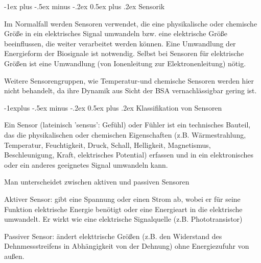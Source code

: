\documentclass[a4paper]{article}
\makeatletter
\renewcommand{\section}{\@startsection{section}{1}{0mm}%
 {-1ex plus -.5ex minus -.2ex}%
 {0.5ex plus .2ex}%
 {\normalfont\large\bfseries}}
\renewcommand{\subsection}{\@startsection{subsection}{2}{0mm}%
 {-1explus -.5ex minus -.2ex}%
 {0.5ex plus .2ex}%
 {\normalfont\normalsize\bfseries}}
\makeatother
\begin{document}
\raggedright
\begin{multicols}{3}\scriptsize
  \setlength{\premulticols}{1pt}
  \setlength{\postmulticols}{1pt}
  \setlength{\multicolsep}{1pt}
  \setlength{\columnsep}{2pt}


  \section{Sensorik}

  Im Normalfall werden Sensoren verwendet, die eine physikalische oder
  chemische Größe in ein elektrisches Signal umwandeln bzw. eine
  elektrische Größe beeinflussen, die weiter verarbeitet werden können.
  Eine Umwandlung der Energieform der Biosignale ist notwendig. Selbst bei
  Sensoren für elektrische Größen ist eine Umwandlung (von Ionenleitung
  zur Elektronenleitung) nötig.

  Weitere Sensorengruppen, wie Temperatur-und chemische Sensoren werden
  hier nicht behandelt, da ihre Dynamik aus Sicht der BSA vernachlässigbar
  gering ist.


  \subsection{Klassifikation von Sensoren}

  Ein Sensor (lateinisch 'sensus': Gefühl) oder Fühler ist ein technisches
  Bauteil, das die physikalischen oder chemischen Eigenschaften (z.B.
  Wärmestrahlung, Temperatur, Feuchtigkeit, Druck, Schall, Helligkeit,
  Magnetismus, Beschleunigung, Kraft, elektrisches Potential) erfassen und
  in ein elektronisches oder ein anderes geeignetes Signal umwandeln kann.

  Man unterscheidet zwischen aktiven und passiven Sensoren

  \begin{itemize*}
    \item Aktiver Sensor: gibt eine Spannung oder einen Strom ab, wobei er für seine Funktion elektrische Energie benötigt oder eine Energieart in die elektrische umwandelt. Er wirkt wie eine elektrische Signalquelle (z.B. Phototransistor)
    \item Passiver Sensor: ändert elekttrische Größen (z.B. den Widerstand des Dehnmessstreifens in Abhängigkeit von der Dehnung) ohne Energiezufuhr von außen.
  \end{itemize*}


\end{multicols}
\end{document}
